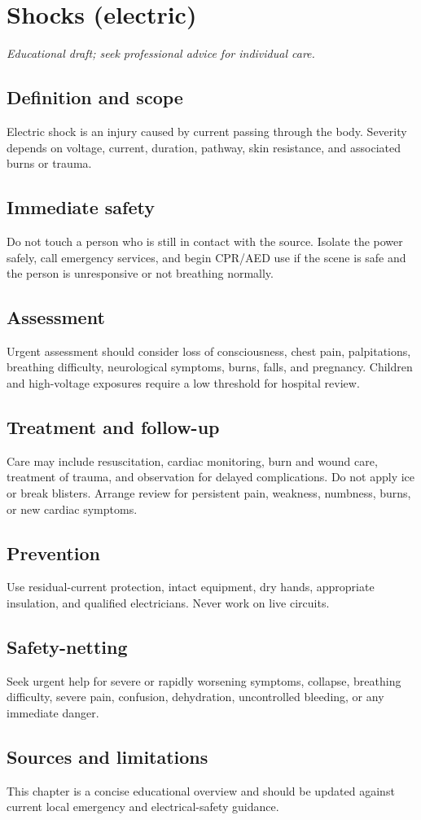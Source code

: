 \chapter{Shocks (electric)}

\medskip
\noindent\textit{Educational draft; seek professional advice for individual care.}

\section*{Definition and scope}
Electric shock is an injury caused by current passing through the body. Severity depends on voltage, current, duration, pathway, skin resistance, and associated burns or trauma.

\section*{Immediate safety}
Do not touch a person who is still in contact with the source. Isolate the power safely, call emergency services, and begin CPR/AED use if the scene is safe and the person is unresponsive or not breathing normally.

\section*{Assessment}
Urgent assessment should consider loss of consciousness, chest pain, palpitations, breathing difficulty, neurological symptoms, burns, falls, and pregnancy. Children and high-voltage exposures require a low threshold for hospital review.

\section*{Treatment and follow-up}
Care may include resuscitation, cardiac monitoring, burn and wound care, treatment of trauma, and observation for delayed complications. Do not apply ice or break blisters. Arrange review for persistent pain, weakness, numbness, burns, or new cardiac symptoms.

\section*{Prevention}
Use residual-current protection, intact equipment, dry hands, appropriate insulation, and qualified electricians. Never work on live circuits.
\section*{Safety-netting}
Seek urgent help for severe or rapidly worsening symptoms, collapse, breathing difficulty, severe pain, confusion, dehydration, uncontrolled bleeding, or any immediate danger.
\section*{Sources and limitations}
This chapter is a concise educational overview and should be updated against current local emergency and electrical-safety guidance.
